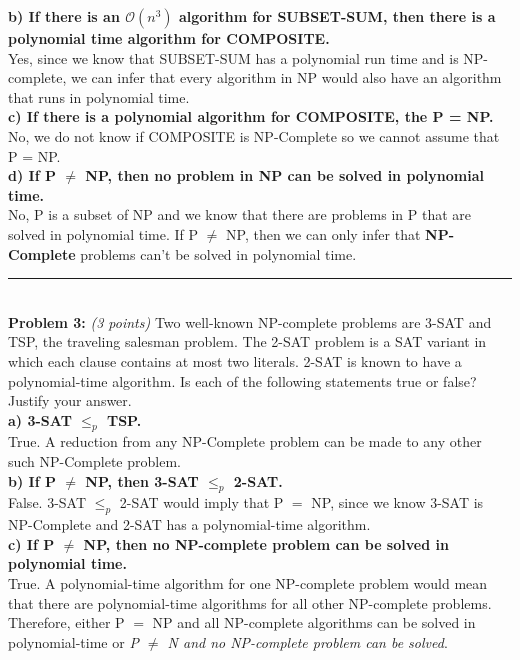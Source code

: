 \documentclass{article}
\begin{document}
\noindent\textbf{b) If there is an $\mathcal{O}(n^3)$ algorithm for SUBSET-SUM, then there is a polynomial time algorithm for COMPOSITE.} \\
Yes, since we know that SUBSET-SUM has a polynomial run time and is NP-complete, we can infer that every algorithm in NP would also have an algorithm that runs in polynomial time. 
\\[.25cm]

\noindent\textbf{c) If there is a polynomial algorithm for COMPOSITE, the P = NP.}\\
No, we do not know if COMPOSITE is NP-Complete so we cannot assume that P = NP.
\\[.25cm]

\noindent\textbf{d) If P $\neq$ NP, then \textbf{no} problem in NP can be solved in polynomial time.}\\
No, P is a subset of NP and we know that there are problems in P that are solved in polynomial time. If P $\neq$ NP, then we can only infer that \textbf{NP-Complete} problems can't be solved in polynomial time. 
\\[.25cm]

\noindent\rule{8cm}{0.4pt}
\\[.25cm]

\noindent \textbf{Problem 3:} \textit{(3 points)} Two well-known NP-complete problems are 3-SAT and TSP, the traveling salesman problem. The 2-SAT problem is a SAT variant in which each clause contains at most two literals. 2-SAT is known to have a polynomial-time algorithm. Is each of the following statements true or false? Justify your answer.\\[.25cm]

\noindent\textbf{a) 3-SAT $\leq _p$ TSP.}\\
True. A reduction from any NP-Complete problem can be made to any other such NP-Complete problem.
\\[.25cm]

\noindent\textbf{b) If P $\neq$ NP, then 3-SAT $\leq _p$ 2-SAT.}\\
False. 3-SAT $\leq _p$ 2-SAT would imply that P $=$ NP, since we know 3-SAT is NP-Complete and 2-SAT has a polynomial-time algorithm.
\\[.25cm]

\noindent\textbf{c) If P $\neq$ NP, then no NP-complete problem can be solved in polynomial time.}\\
True. A polynomial-time algorithm for one NP-complete problem would mean that there are polynomial-time algorithms for all other NP-complete problems. Therefore, either P $=$ NP and all NP-complete algorithms can be solved in polynomial-time or \textit{P $\neq$ N and no NP-complete problem can be solved}. 
\\[.25cm]
\end{document}
